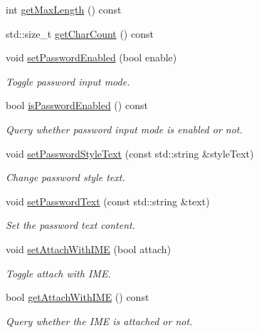 \begin{DoxyCompactItemize}
\item 
int \hyperlink{classui_1_1UICCTextField_a7603841f39081a4c538a71096904975c}{get\+Max\+Length} () const
\item 
std\+::size\+\_\+t \hyperlink{classui_1_1UICCTextField_a2f8ba9d180b639dc4e4b77e1e052aecb}{get\+Char\+Count} () const
\item 
void \hyperlink{classui_1_1UICCTextField_a8cec7c2ce0befc7c7f9f9e5d8bdae59a}{set\+Password\+Enabled} (bool enable)
\begin{DoxyCompactList}\small\item\em Toggle password input mode. \end{DoxyCompactList}\item 
bool \hyperlink{classui_1_1UICCTextField_a993531ac778c06a81f91cd465edd72ef}{is\+Password\+Enabled} () const
\begin{DoxyCompactList}\small\item\em Query whether password input mode is enabled or not. \end{DoxyCompactList}\item 
void \hyperlink{classui_1_1UICCTextField_a3fe6bde05e9a4b16abaf0eddf79f2ed6}{set\+Password\+Style\+Text} (const std\+::string \&style\+Text)
\begin{DoxyCompactList}\small\item\em Change password style text. \end{DoxyCompactList}\item 
void \hyperlink{classui_1_1UICCTextField_a5dd72d55d3859c50ca346d0a76b66bfa}{set\+Password\+Text} (const std\+::string \&text)
\begin{DoxyCompactList}\small\item\em Set the password text content. \end{DoxyCompactList}\item 
void \hyperlink{classui_1_1UICCTextField_ac3f1fe1e8d88650662ffa07b4f1063d5}{set\+Attach\+With\+I\+ME} (bool attach)
\begin{DoxyCompactList}\small\item\em Toggle attach with I\+ME. \end{DoxyCompactList}\item 
bool \hyperlink{classui_1_1UICCTextField_a101f42cff95aabcc31b1be1d6d84795d}{get\+Attach\+With\+I\+ME} () const
\begin{DoxyCompactList}\small\item\em Query whether the I\+ME is attached or not. \end{DoxyCompactList}\item 

\end{DoxyCompactItemize}
